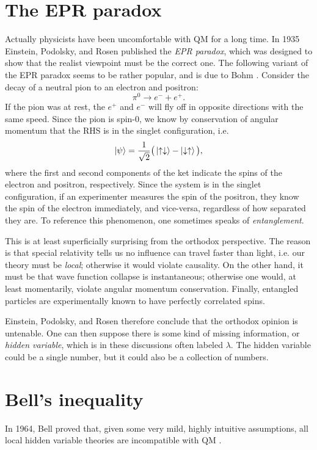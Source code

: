 \section{The EPR paradox}
Actually physicists have been uncomfortable with QM for a long time.
In 1935 Einstein, Podolsky, and Rosen
\cite{einstein_can_1935} published the {\it EPR paradox},
which was designed to show that the realist viewpoint must be
the correct one. The following variant of the EPR paradox seems to be
rather popular, and is due to Bohm \cite{bohm_quantum_1951}.
Consider the decay of a neutral pion to an electron and positron:
\begin{equation}
  \pi^0\to e^-+e^+.
\end{equation}
If the pion was at rest, the $e^+$ and $e^-$ will fly off in opposite
directions with the same speed. Since the pion is spin-0, we know
by conservation of angular momentum that the RHS is in the
singlet configuration, i.e.
\begin{equation}
  \ket{\psi}=\frac{1}{\sqrt{2}}\big(
   \ket{\uparrow\downarrow}-\ket{\downarrow\uparrow}\big),
\end{equation}
where the first and second components of the ket indicate the spins of
the electron and positron, respectively.
Since the system is in the singlet configuration, if an experimenter
measures the spin of the positron, they know the spin of the electron
immediately, and vice-versa, regardless of how separated they are.
To reference this phenomenon, one sometimes speaks of {\it entanglement}.

This is at least superficially surprising from the orthodox perspective.
The reason is that special relativity tells us no influence can travel
faster than light, i.e. our theory must be {\it local}; 
otherwise it would violate causality. On the other
hand, it must be that wave function collapse is instantaneous; otherwise
one would, at least momentarily, violate angular momentum conservation.
Finally, entangled particles are experimentally known to have perfectly
correlated spins. 

Einstein, Podolsky, and Rosen therefore conclude
that the orthodox opinion is untenable. One can then suppose there is
some kind of missing information, or {\it hidden variable}, which
is in these discussions often labeled $\lambda$. The hidden variable
could be a single number, but it could also be a collection
of numbers.

\section{Bell's inequality}
In 1964, Bell proved that, given some very mild, highly intuitive assumptions,
all local hidden variable theories are incompatible with QM
\cite{bell_einstein_1964}.

